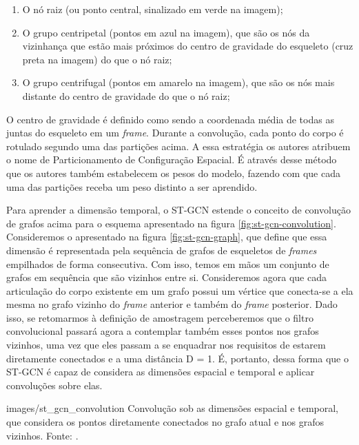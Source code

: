 \begin{enumerate}
    \item O nó raiz (ou ponto central, sinalizado em verde na imagem);
    \item O grupo centripetal (pontos em azul na imagem), que são os nós da vizinhança que estão mais próximos do centro de gravidade do esqueleto (cruz preta na imagem) do que o nó raiz;
    \item O grupo centrifugal (pontos em amarelo na imagem), que são os nós mais distante do centro de gravidade do que o nó raiz;
\end{enumerate}

O centro de gravidade é definido como sendo a coordenada média de todas as juntas do esqueleto em um \textit{frame}. Durante a convolução, cada ponto do corpo é rotulado segundo uma das partições acima. A essa estratégia os autores atribuem o nome de Particionamento de Configuração Espacial. É através desse método que os autores também estabelecem os pesos do modelo, fazendo com que cada uma das partições receba um peso distinto a ser aprendido.


Para aprender a dimensão temporal, o ST-GCN estende o conceito de convolução de grafos acima para o esquema apresentado na figura \ref{fig:st-gcn-convolution}. Consideremos o apresentado na figura \ref{fig:st-gcn-graph}, que define que essa dimensão é representada pela sequência de grafos de esqueletos de \textit{frames} empilhados de forma consecutiva. Com isso, temos em mãos um conjunto de grafos em sequência que são vizinhos entre si. Consideremos agora que cada articulação do corpo existente em um grafo possui um vértice que conecta-se a ela mesma no grafo vizinho do \textit{frame} anterior e também do \textit{frame} posterior. Dado isso, se retomarmos à definição de amostragem perceberemos que o filtro convolucional passará agora a contemplar também esses pontos nos grafos vizinhos, uma vez que eles passam a se enquadrar nos requisitos de estarem diretamente conectados e a uma distância D = 1. É, portanto, dessa forma que o ST-GCN é capaz de considera as dimensões espacial e temporal e aplicar convoluções sobre elas.

    {images/st_gcn_convolution}
    {Convolução sob as dimensões espacial e temporal, que considera os pontos diretamente conectados no grafo atual e nos grafos vizinhos. Fonte: \cite[p. 3]{st-gcn-2018}.}


